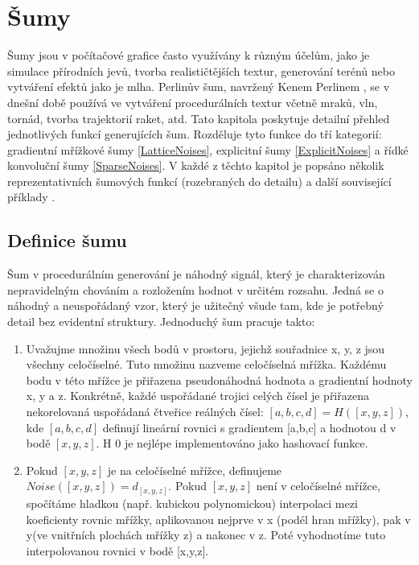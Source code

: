 \section{Šumy}
\label{noise}
Šumy jsou v počítačové grafice často využívány k různým účelům, jako je simulace přírodních jevů, tvorba realističtějších textur, generování terénů nebo vytváření efektů jako je mlha. Perlinův šum, navržený Kenem Perlinem \cite{PerlinKen}, se v dnešní době používá ve vytváření procedurálních textur včetně mraků, vln, tornád, tvorba trajektorií raket, atd. Tato kapitola poskytuje detailní přehled jednotlivých funkcí generujících šum. Rozděluje tyto funkce do tří kategorií: gradientní mřížkové šumy \ref{LatticeNoises}, explicitní šumy \ref{ExplicitNoises} a řídké konvoluční šumy \ref{SparseNoises}. V každé z těchto kapitol je popsáno několik reprezentativních šumových funkcí (rozebraných do detailu) a další související příklady \cite{Lagae10}. 

\subsection{Definice šumu}
Šum v procedurálním generování je náhodný signál, který je charakterizován nepravidelným chováním a rozložením hodnot v určitém rozsahu. \cite{PerlinKen} Jedná se o náhodný a neuspořádaný vzor, který je užitečný všude tam, kde je potřebný detail bez evidentní struktury. Jednoduchý šum pracuje takto:
\begin{enumerate}
	\item Uvažujme množinu všech bodů v prostoru, jejichž souřadnice x, y, z jsou všechny celočíselné. Tuto množinu nazveme celočíselná mřížka. Každému bodu v této mřížce je přiřazena pseudonáhodná hodnota a gradientní hodnoty x, y a z. Konkrétně, každé uspořádané trojici celých čísel je přiřazena nekorelovaná uspořádaná čtveřice reálných čísel: $[a,b,c,d] = H([x,y,z])$, kde $[a,b,c,d]$ definují lineární rovnici s gradientem [a,b,c] a hodnotou d v bodě $[x,y,z]$. H 0 je nejlépe implementováno jako hashovací funkce.
	\item Pokud $[x,y,z]$ je na celočíselné mřížce, definujeme $Noise([x,y,z]) = d_{[x,y,z]}$. Pokud $[x,y,z]$ není v celočíselné mřížce, spočítáme hladkou (např. kubickou polynomickou) interpolaci mezi koeficienty rovnic mřížky, aplikovanou nejprve v x (podél hran mřížky), pak v y(ve vnitřních plochách mřížky z) a nakonec v z. Poté vyhodnotíme tuto interpolovanou rovnici v bodě [x,y,z]. 
\end{enumerate}

